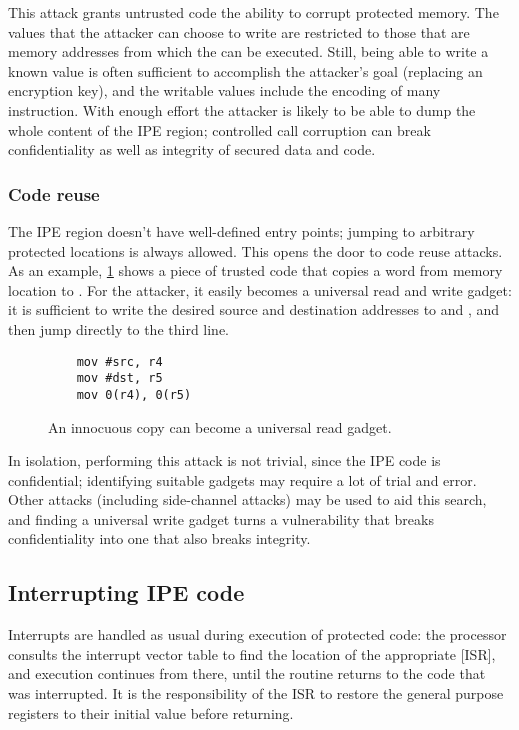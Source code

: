 This attack grants untrusted code the ability to corrupt protected memory. The values that the attacker can choose to write are restricted to those that are memory addresses from which the  can be executed. Still, being able to write a known value is often sufficient to accomplish the attacker's goal (\eg replacing an encryption key), and the writable values include the encoding of many instruction. With enough effort the attacker is likely to be able to dump the whole content of the IPE region; controlled call corruption can break confidentiality as well as integrity of secured data and code.

\subsubsection{Code reuse}
\label{sec:code-reuse}

The IPE region doesn't have well-defined entry points; jumping to arbitrary protected locations is always allowed. This opens the door to code reuse attacks. As an example, \cref{fig:read-gadget} shows a piece of trusted code that copies a word from memory location   to . For the attacker, it easily becomes a universal read and write gadget: it is sufficient to write the desired source and destination addresses to  and , and then jump directly to the third line.

\begin{figure}
  \begin{verbatim}
    mov #src, r4
    mov #dst, r5
    mov 0(r4), 0(r5)
  \end{verbatim}%
  \caption{An innocuous copy can become a universal read gadget.}
  \label{fig:read-gadget}
\end{figure}

In isolation, performing this attack is not trivial, since the IPE code is confidential; identifying suitable gadgets may require a lot of trial and error. Other attacks (including side-channel attacks) may be used to aid this search, and finding a universal write gadget turns a vulnerability that breaks confidentiality into one that also breaks integrity.

\subsection{Interrupting IPE code}
\label{sec:interrupts}

Interrupts are handled as usual during execution of protected code: the processor consults the interrupt vector table to find the location of the appropriate [ISR], and execution continues from there, until the routine returns to the code that was interrupted. It is the responsibility of the ISR to restore the general purpose registers to their initial value before returning.

